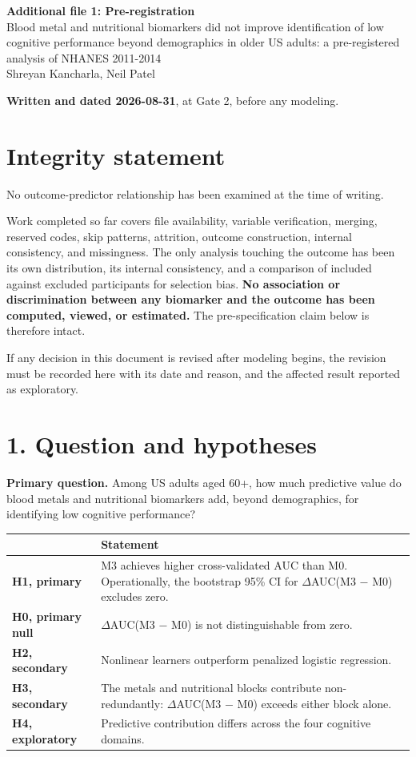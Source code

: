 \documentclass[11pt]{article}
\title{}
\date{}
\begin{document}
\begin{center}
{\large\bfseries Additional file 1: Pre-registration}\\[2pt]
{\small Blood metal and nutritional biomarkers did not improve identification of low cognitive performance beyond demographics in older US adults: a pre-registered analysis of NHANES 2011-2014}\\[2pt]
{\small Shreyan Kancharla, Neil Patel}
\end{center}

\bigskip

\textbf{Written and dated 2026-08-31}, at Gate 2, before any modeling.

\section*{Integrity statement}

No outcome-predictor relationship has been examined at the time of writing.

Work completed so far covers file availability, variable verification, merging, reserved codes, skip patterns, attrition, outcome construction, internal consistency, and missingness. The only analysis touching the outcome has been its own distribution, its internal consistency, and a comparison of included against excluded participants for selection bias. \textbf{No association or discrimination between any biomarker and the outcome has been computed, viewed, or estimated.} The pre-specification claim below is therefore intact.

If any decision in this document is revised after modeling begins, the revision must be recorded here with its date and reason, and the affected result reported as exploratory.

\section*{1. Question and hypotheses}

\textbf{Primary question.} Among US adults aged 60+, how much predictive value do blood metals and nutritional biomarkers add, beyond demographics, for identifying low cognitive performance?

\begin{longtable}{L{3.2cm}L{11cm}}
\toprule
& Statement \\
\midrule
\endhead
\textbf{H1, primary} & M3 achieves higher cross-validated AUC than M0. Operationally, the bootstrap 95\% CI for $\Delta$AUC(M3 $-$ M0) excludes zero. \\
\textbf{H0, primary null} & $\Delta$AUC(M3 $-$ M0) is not distinguishable from zero. \\
\textbf{H2, secondary} & Nonlinear learners outperform penalized logistic regression. \\
\textbf{H3, secondary} & The metals and nutritional blocks contribute non-redundantly: $\Delta$AUC(M3 $-$ M0) exceeds either block alone. \\
\textbf{H4, exploratory} & Predictive contribution differs across the four cognitive domains. \\
\bottomrule
\end{longtable}
\end{document}
